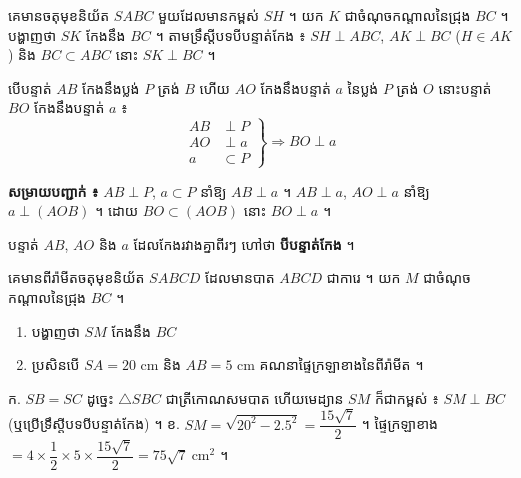 \begin{example}[លំហាត់គំរូ]
គេមានចតុមុខនិយ័ត $SABC$ មួយដែលមានកម្ពស់ $SH$ ។ យក $K$ ជាចំណុចកណ្ដាលនៃជ្រុង $BC$ ។ បង្ហាញថា $SK$ កែងនឹង $BC$ ។
\ans
តាមទ្រឹស្ដីបទបីបន្ទាត់កែង ៖ $SH \perp ABC$, $AK \perp BC$ ($H \in AK$) និង $BC \subset ABC$ នោះ $SK \perp BC$ ។
\end{example}

\begin{theorem}[ទ្រឹស្ដីបទច្រាសនៃបីបន្ទាត់កែង]
បើបន្ទាត់ $AB$ កែងនឹងប្លង់ $P$ ត្រង់ $B$ ហើយ $AO$ កែងនឹងបន្ទាត់ $a$ នៃប្លង់ $P$ ត្រង់ $O$ នោះបន្ទាត់ $BO$ កែងនឹងបន្ទាត់ $a$ ៖
\[
\left.\begin{aligned} AB &\perp P\\ AO &\perp a\\ a &\subset P \end{aligned}\right\} \Rightarrow BO \perp a
\]
\end{theorem}
\textbf{សម្រាយបញ្ជាក់ ៖} $AB \perp P$, $a \subset P$ នាំឱ្យ $AB \perp a$ ។ $AB \perp a$, $AO \perp a$ នាំឱ្យ $a \perp (AOB)$ ។ ដោយ $BO \subset (AOB)$ នោះ $BO \perp a$ ។
\begin{note}[សម្គាល់]
បន្ទាត់ $AB$, $AO$ និង $a$ ដែលកែងរវាងគ្នាពីរៗ ហៅថា \textbf{បីបន្ទាត់កែង} ។
\end{note}

\begin{pro}
គេមានពីរ៉ាមីតចតុមុខនិយ័ត $SABCD$ ដែលមានបាត $ABCD$ ជាការេ ។ យក $M$ ជាចំណុចកណ្ដាលនៃជ្រុង $BC$ ។
\begin{enumerate}[a]
  \item បង្ហាញថា $SM$ កែងនឹង $BC$
  \item ប្រសិនបើ $SA = 20$ cm និង $AB = 5$ cm គណនាផ្ទៃក្រឡាខាងនៃពីរ៉ាមីត ។
\end{enumerate}
\ans
ក. $SB = SC$ ដូច្នេះ $\triangle SBC$ ជាត្រីកោណសមបាត ហើយមេដ្យាន $SM$ ក៏ជាកម្ពស់ ៖ $SM \perp BC$ (ឬប្រើទ្រឹស្ដីបទបីបន្ទាត់កែង) ។ \quad ខ. $SM = \sqrt{20^2 - 2.5^2} = \dfrac{15\sqrt{7}}{2}$ ។ ផ្ទៃក្រឡាខាង $= 4\times\dfrac{1}{2}\times 5\times\dfrac{15\sqrt{7}}{2} = 75\sqrt{7}\ \text{cm}^2$ ។
\end{pro}

